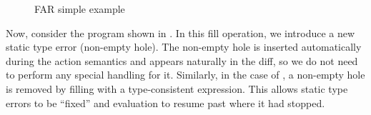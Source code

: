 \begin{figure}
  \centering
  \begin{singlespace}
    \vspace{10pt}
    \vspace{10pt}
  \end{singlespace}
  \caption{FAR simple example}
  \label{fig:far-simple-example}
\end{figure}

Now, consider the program shown in . In this fill operation, we introduce a new static type error (non-empty hole). The non-empty hole is inserted automatically during the action semantics and appears naturally in the diff, so we do not need to perform any special handling for it. Similarly, in the case of , a non-empty hole is removed by filling with a type-consistent expression. This allows static type errors to be ``fixed'' and evaluation to resume past where it had stopped.

